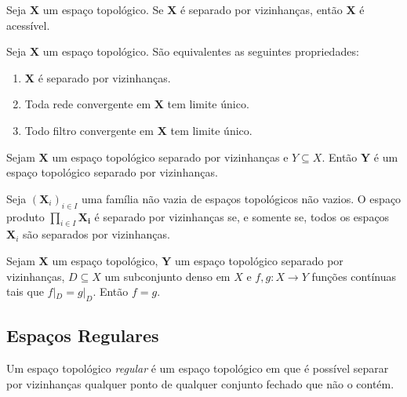 \begin{prop}[$T_2 \Rightarrow T_1$]
Seja $\bm X$ um espaço topológico. Se $\bm X$ é separado por vizinhanças, então $\bm X$ é acessível.
\end{prop}

\begin{prop}
Seja $\bm X$ um espaço topológico. São equivalentes as seguintes propriedades:
	\begin{enumerate}
	\item $\bm X$ é separado por vizinhanças.
	\item Toda rede convergente em $\bm X$ tem limite único.
	\item Todo filtro convergente em $\bm X$ tem limite único.
	\end{enumerate}
\end{prop}

\begin{prop}
Sejam $\bm X$ um espaço topológico separado por vizinhanças e $Y \subseteq X$. Então $\bm Y$ é um espaço topológico separado por vizinhanças.
\end{prop}

\begin{prop}
Seja $(\bm X_i)_{i \in I}$ uma família não vazia de espaços topológicos não vazios. O espaço produto $\prod_{i \in I} \bm{X_i}$ é separado por vizinhanças se, e somente se, todos os espaços $\bm X_i$ são separados por vizinhanças.
\end{prop}

\begin{prop}
Sejam $\bm X$ um espaço topológico, $\bm Y$ um espaço topológico separado por vizinhanças, $D \subseteq X$ um subconjunto denso em $X$ e $f,g: X \to Y$ funções contínuas tais que $f|_D=g|_D$. Então $f=g$.
\end{prop}

\subsection{Espaços Regulares}

\begin{defi}
Um espaço topológico \emph{regular} é um espaço topológico
em que é possível separar por vizinhanças qualquer ponto de qualquer conjunto fechado que não o contém.
\end{defi}

